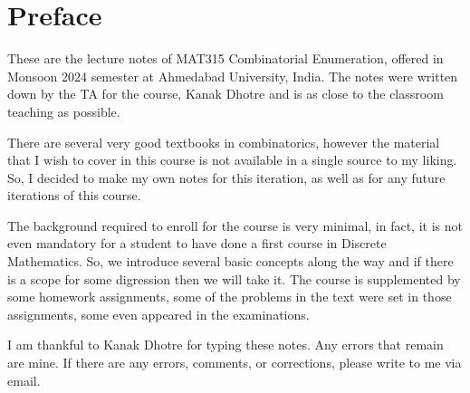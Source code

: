 %

\chapter*{Preface}

These are the lecture notes of MAT315 Combinatorial Enumeration, offered in Monsoon 2024 semester at Ahmedabad University, India. The notes were written down by the TA for the course, Kanak Dhotre and is as close to the classroom teaching as possible.

There are several very good textbooks in combinatorics, however the material that I wish to cover in this course is not available in a single source to my liking. So, I decided to make my own notes for this iteration, as well as for any future iterations of this course.

The background required to enroll for the course is very minimal, in fact, it is not even mandatory for a student to have done a first course in Discrete Mathematics. So, we introduce several basic concepts along the way and if there is a scope for some digression then we will take it. The course is supplemented by some homework assignments, some of the problems in the text were set in those assignments, some even appeared in the examinations.

I am thankful to Kanak Dhotre for typing these notes. Any errors that remain are mine. If there are any errors, comments, or corrections, please write to me via email.


